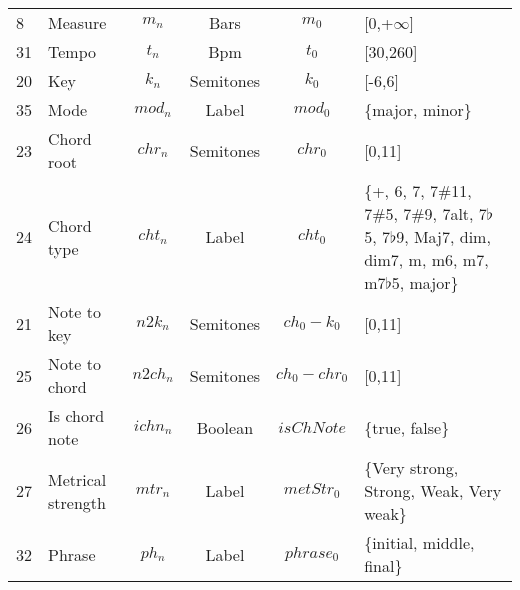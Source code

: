 \begin{table}
{\begin{tabular}{l l c c c p{2.5cm} }
    8 & Measure & $m_n$ & Bars & $m_0$ & [0,+$\infty$] \\
    31 & Tempo & $t_n$ & Bpm & $t_0$ & [30,260] \\
    20 & Key & $k_n$ & Semitones & $k_0$ & [-6,6] \\
 	35 & Mode & $mod_n$ & Label & $mod_0$ & \{major, minor\} \\
 	23 & Chord root & $chr_n$ & Semitones & $chr_0$ & [0,11] \\
    24 & Chord type & $cht_n$ & Label & $cht_0$  & \{+, 6, 7, 7\#11, 7\#5, 7\#9, 7alt, 7$\flat$5, 7$\flat$9, Maj7, dim, dim7, m, m6, m7, m7$\flat$5, major\} \\
    21 & Note to key & $n2k_n$ & Semitones & $ch_0-k_0$ & [0,11] \\
	25 & Note to chord & $n2ch_n$ & Semitones & $ch_0-chr_0$ & [0,11] \\
 	26 & Is chord note & $ichn_n$ & Boolean & $isChNote$ & \{true, false\} \\
 	27 & Metrical strength & $mtr_n$ & Label & $metStr_0$ & \{Very strong, Strong, Weak, Very weak\} \\
 	32 & Phrase & $ph_n$ & Label & $phrase_0$ & \{initial, middle, final\} \\
 

    \hline

  \end{tabular}
  }
\end{table}
